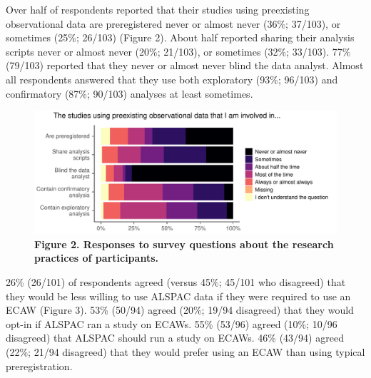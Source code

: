 \documentclass[
  man,floatsintext]{apa6}
\begin{document}
Over half of respondents reported that their studies using preexisting observational data are preregistered never or almost never (36\%; 37/103), or sometimes (25\%; 26/103) (Figure 2). About half reported sharing their analysis scripts never or almost never (20\%; 21/103), or sometimes (32\%; 33/103). 77\% (79/103) reported that they never or almost never blind the data analyst. Almost all respondents answered that they use both exploratory (93\%; 96/103) and confirmatory (87\%; 90/103) analyses at least sometimes.

\begin{figure}[H]

{\centering \includegraphics[width=1\linewidth]{figs/methodPlot-1} 

}

\caption{\textbf{Figure 2. Responses to survey questions about the research practices of participants.}}\label{fig:methodPlot}
\end{figure}

{\smaller[1] \singlespacing



}

26\% (26/101) of respondents agreed (versus 45\%; 45/101 who disagreed) that they would be less willing to use ALSPAC data if they were required to use an ECAW (Figure 3). 53\% (50/94) agreed (20\%; 19/94 disagreed) that they would opt-in if ALSPAC ran a study on ECAWs. 55\% (53/96) agreed (10\%; 10/96 disagreed) that ALSPAC should run a study on ECAWs. 46\% (43/94) agreed (22\%; 21/94 disagreed) that they would prefer using an ECAW than using typical preregistration.
\end{document}
